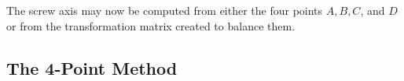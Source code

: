 \documentclass{svproc}
\begin{document}



The screw axis may now
be computed from either the four points $A,B,C$, and $D$ or from the transformation
matrix created to balance them.





\subsection{The 4-Point Method}
\end{document}
